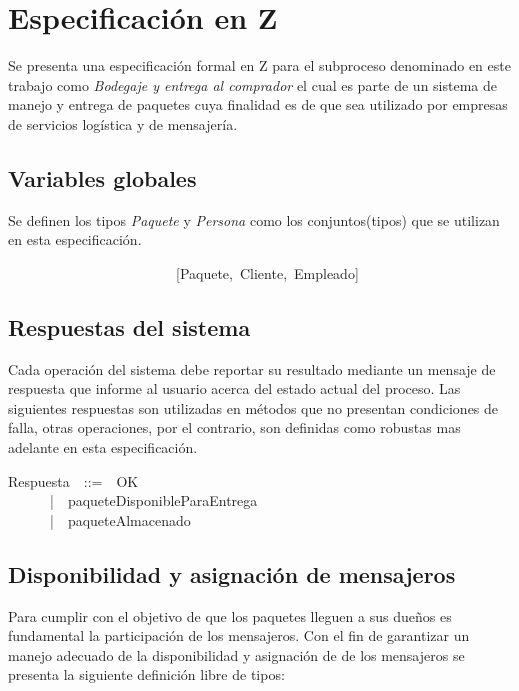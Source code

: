 \documentclass[12pt,a4paper]{article}
\begin{document}
\newpage
\section{Especificación en Z}

Se presenta una especificación formal en Z para el subproceso denominado en este trabajo como \textit{Bodegaje y entrega al comprador} el cual es parte de un sistema de manejo y entrega de paquetes cuya finalidad es de que sea utilizado por empresas de servicios logística y de mensajería.  

\subsection{Variables globales}
Se definen los tipos \textit{Paquete} y \textit{Persona}  como los conjuntos(tipos) que se utilizan en esta especificación. 

\begin{zed}
~~~~~~~~~~~~~~~~~~~~~~~~[Paquete,~Cliente,~Empleado]
\end{zed}

\subsection{Respuestas del sistema}

Cada operación del sistema debe reportar su resultado mediante un mensaje de respuesta que informe al usuario acerca del estado actual del proceso. Las siguientes respuestas son utilizadas en métodos que no presentan condiciones de falla, otras operaciones, por el contrario, son definidas como robustas mas adelante en esta especificación.

\begin{zed}
Respuesta~~::=~~OK\\
~~~~~~|~~paqueteDisponibleParaEntrega\\
~~~~~~|~~paqueteAlmacenado\\
\end{zed}

\subsection{Disponibilidad y asignación de mensajeros}
\indent Para cumplir con el objetivo de que los paquetes lleguen a sus dueños es fundamental la participación de los mensajeros. Con el fin de garantizar un manejo adecuado de la disponibilidad y asignación de de los mensajeros se presenta la siguiente definición libre de tipos:
\end{document}

